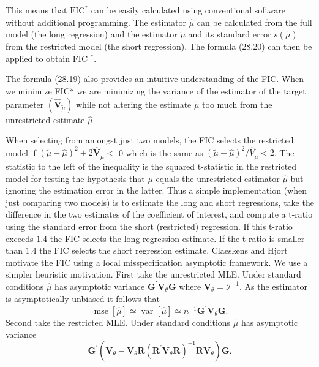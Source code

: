 \documentclass[10pt]{article}
\begin{document}
This means that $\mathrm{FIC}^{*}$ can be easily calculated using conventional software without additional programming. The estimator $\widehat{\mu}$ can be calculated from the full model (the long regression) and the estimator $\widetilde{\mu}$ and its standard error $s(\widetilde{\mu})$ from the restricted model (the short regression). The formula (28.20) can then be applied to obtain FIC $^{*}$.

The formula (28.19) also provides an intuitive understanding of the FIC. When we minimize FIC* we are minimizing the variance of the estimator of the target parameter $\left(\widehat{\boldsymbol{V}}_{\widetilde{\mu}}\right)$ while not altering the estimate $\widetilde{\mu}$ too much from the unrestricted estimate $\widehat{\mu}$.

When selecting from amongst just two models, the FIC selects the restricted model if $(\widetilde{\mu}-\widehat{\mu})^{2}+2 \widehat{\boldsymbol{V}}_{\widetilde{\mu}}<$ 0 which is the same as $(\widetilde{\mu}-\widehat{\mu})^{2} / \widehat{V}_{\widetilde{\mu}}<2$. The statistic to the left of the inequality is the squared t-statistic in the restricted model for testing the hypothesis that $\mu$ equals the unrestricted estimator $\widehat{\mu}$ but ignoring the estimation error in the latter. Thus a simple implementation (when just comparing two models) is to estimate the long and short regressions, take the difference in the two estimates of the coefficient of interest, and compute a t-ratio using the standard error from the short (restricted) regression. If this t-ratio exceeds $1.4$ the FIC selects the long regression estimate. If the t-ratio is smaller than $1.4$ the FIC selects the short regression estimate. Claeskens and Hjort motivate the FIC using a local misspecification asymptotic framework. We use a simpler heuristic motivation. First take the unrestricted MLE. Under standard conditions $\widehat{\mu}$ has asymptotic variance $\boldsymbol{G}^{\prime} \boldsymbol{V}_{\theta} \boldsymbol{G}$ where $\boldsymbol{V}_{\theta}=\mathscr{I}^{-1}$. As the estimator is asymptotically unbiased it follows that
$$
\operatorname{mse}[\widehat{\mu}] \simeq \operatorname{var}[\widehat{\mu}] \simeq n^{-1} \boldsymbol{G}^{\prime} \boldsymbol{V}_{\theta} \boldsymbol{G} .
$$
Second take the restricted MLE. Under standard conditions $\widetilde{\mu}$ has asymptotic variance
$$
\boldsymbol{G}^{\prime}\left(\boldsymbol{V}_{\theta}-\boldsymbol{V}_{\theta} \boldsymbol{R}\left(\boldsymbol{R}^{\prime} \boldsymbol{V}_{\theta} \boldsymbol{R}\right)^{-1} \boldsymbol{R} \boldsymbol{V}_{\theta}\right) \boldsymbol{G} .
$$
\end{document}
